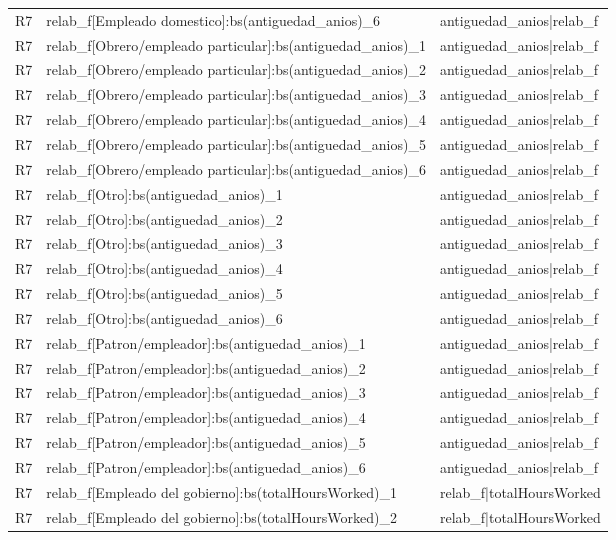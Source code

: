 \begin{longtable}{lll}
R7 & relab\_f[Empleado domestico]:bs(antiguedad\_anios)\_6 & antiguedad\_anios|relab\_f \\
R7 & relab\_f[Obrero/empleado particular]:bs(antiguedad\_anios)\_1 & antiguedad\_anios|relab\_f \\
R7 & relab\_f[Obrero/empleado particular]:bs(antiguedad\_anios)\_2 & antiguedad\_anios|relab\_f \\
R7 & relab\_f[Obrero/empleado particular]:bs(antiguedad\_anios)\_3 & antiguedad\_anios|relab\_f \\
R7 & relab\_f[Obrero/empleado particular]:bs(antiguedad\_anios)\_4 & antiguedad\_anios|relab\_f \\
R7 & relab\_f[Obrero/empleado particular]:bs(antiguedad\_anios)\_5 & antiguedad\_anios|relab\_f \\
R7 & relab\_f[Obrero/empleado particular]:bs(antiguedad\_anios)\_6 & antiguedad\_anios|relab\_f \\
R7 & relab\_f[Otro]:bs(antiguedad\_anios)\_1 & antiguedad\_anios|relab\_f \\
R7 & relab\_f[Otro]:bs(antiguedad\_anios)\_2 & antiguedad\_anios|relab\_f \\
R7 & relab\_f[Otro]:bs(antiguedad\_anios)\_3 & antiguedad\_anios|relab\_f \\
R7 & relab\_f[Otro]:bs(antiguedad\_anios)\_4 & antiguedad\_anios|relab\_f \\
R7 & relab\_f[Otro]:bs(antiguedad\_anios)\_5 & antiguedad\_anios|relab\_f \\
R7 & relab\_f[Otro]:bs(antiguedad\_anios)\_6 & antiguedad\_anios|relab\_f \\
R7 & relab\_f[Patron/empleador]:bs(antiguedad\_anios)\_1 & antiguedad\_anios|relab\_f \\
R7 & relab\_f[Patron/empleador]:bs(antiguedad\_anios)\_2 & antiguedad\_anios|relab\_f \\
R7 & relab\_f[Patron/empleador]:bs(antiguedad\_anios)\_3 & antiguedad\_anios|relab\_f \\
R7 & relab\_f[Patron/empleador]:bs(antiguedad\_anios)\_4 & antiguedad\_anios|relab\_f \\
R7 & relab\_f[Patron/empleador]:bs(antiguedad\_anios)\_5 & antiguedad\_anios|relab\_f \\
R7 & relab\_f[Patron/empleador]:bs(antiguedad\_anios)\_6 & antiguedad\_anios|relab\_f \\
R7 & relab\_f[Empleado del gobierno]:bs(totalHoursWorked)\_1 & relab\_f|totalHoursWorked \\
R7 & relab\_f[Empleado del gobierno]:bs(totalHoursWorked)\_2 & relab\_f|totalHoursWorked \\

\end{longtable}
